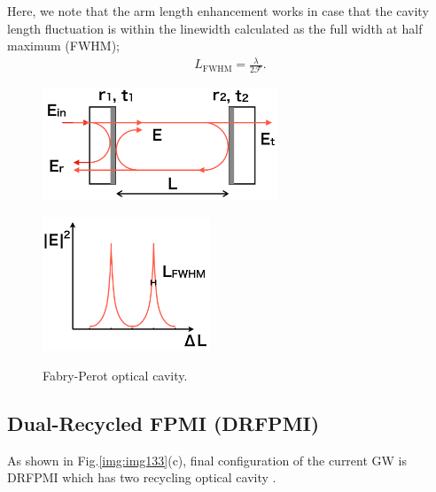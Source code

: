 Here, we note that the arm length enhancement works in case that the cavity length fluctuation is within the linewidth calculated as the full width at half maximum (FWHM);
\begin{eqnarray}
  L_{\mathrm{FWHM}} = \frac{\lambda}{2\mathcal{F}}\label{eq:eq131}.
\end{eqnarray}


\begin{figure}[h]
  \begin{minipage}[b]{0.5\hsize}
    \begin{center}   
      \includegraphics[width=7cm]{./img_chap1/img133a.png}
       \label{img:img133a}
    \end{center}
  \end{minipage}\hspace{3pt}
  \begin{minipage}[b]{0.5\hsize}
    \begin{center}   
      \includegraphics[width=5cm]{./img_chap1/img133b.png}
       \label{img:img133b}
    \end{center}    
  \end{minipage}
  \caption{Fabry-Perot optical cavity.}
\end{figure}


\subsection{Dual-Recycled FPMI (DRFPMI)}
As shown in Fig.\ref{img:img133}(c), final configuration of the current GW is DRFPMI which has two recycling optical cavity \cite{meers1988recycling}.

